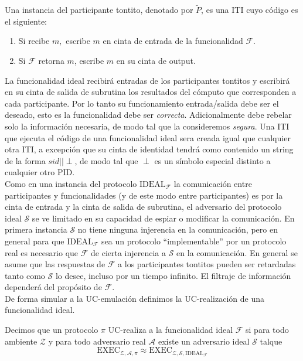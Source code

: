 \begin{definicion}
Una instancia del participante tontito, denotado por $\tilde P$, es una ITI cuyo código es el siguiente:
\begin{enumerate}
    \item Si recibe $m,$ escribe $m$ en cinta de entrada de la funcionalidad $\mathcal{F}$.
    \item Si $\mathcal{F}$ retorna $m$, escribe $m$ en su cinta de output. 
\end{enumerate}
\end{definicion}

La funcionalidad ideal recibirá entradas de los participantes tontitos y escribirá en su cinta de salida de
subrutina los resultados del cómputo que corresponden a cada participante. Por lo tanto su funcionamiento
entrada/salida debe ser el deseado, esto es la funcionalidad debe ser \textit{correcta}. Adicionalmente
debe rebelar solo la información necesaria, de modo tal que la consideremos \textit{segura}. Una ITI
que ejecuta el código de una funcionalidad ideal sera creada igual que cualquier otra ITI, a excepción
que su cinta de identidad tendrá como contenido un string de la forma $sid||\perp$, de modo tal que $\perp$
es un símbolo especial distinto a cualquier otro PID.\\
Como en una instancia del protocolo $\mathrm{IDEAL}_\mathcal{F}$ la comunicación entre participantes y
funcionalidades (y de este modo entre participantes) es por la cinta de entrada y la cinta de salida
de subrutina, el adversario del protocolo ideal $\mathcal{S}$ se ve limitado en su capacidad de
espiar o modificar la comunicación. En primera instancia $\mathcal{S}$  no tiene ninguna injerencia en
la comunicación, pero en general para que $\mathrm{IDEAL}_\mathcal{F}$ sea un protocolo ``implementable''
por un protocolo real es necesario que $\mathcal{F}$ de cierta injerencia a $\mathcal{S}$ en la comunicación.
En general se asume que las respuestas de $\mathcal{F}$ a los participantes tontitos pueden ser retardadas tanto
como $\mathcal{S}$ lo desee, incluso por un tiempo infinito. El filtraje de información dependerá del propósito
de $\mathcal{F}$.\\
De forma simular a la UC-emulación definimos la UC-realización de una funcionalidad ideal.

\begin{definicion}[UC-realización]
Decimos que un protocolo $\pi$ UC-realiza a la funcionalidad ideal $\mathcal{F}$ si para todo ambiente
$\mathcal{Z}$ y para todo adversario real $\mathcal{A}$ existe un adversario ideal $\mathcal{S}$ talque
$$
\mathrm{EXEC}_{
    \mathcal{Z},
    \mathcal{A},
    \pi}
\approx
\mathrm{EXEC}_{
    \mathcal{Z},
    \mathcal{S},
    \mathrm{IDEAL}_\mathcal{F}}
$$
\end{definicion}

